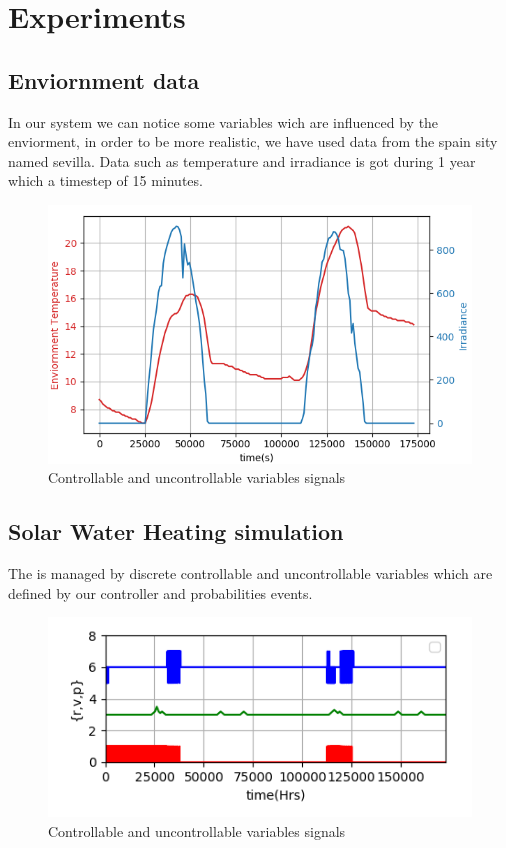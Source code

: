 \documentclass[conference]{IEEEtran}
\begin{document}
\section{Experiments}

\subsection{Enviornment data}
In our system we can notice some variables wich are influenced by the enviorment,
in order to be more realistic, we have used data from the spain sity named sevilla.
Data such as temperature and irradiance is got during 1 year which a timestep 
of 15 minutes.

\begin{figure}[H]  %
  \includegraphics[scale = 0.35]{7}
  \caption{Controllable and uncontrollable variables signals}
  \centering
\end{figure}



\subsection{Solar Water Heating simulation}\label{AA}

The is managed by discrete controllable and uncontrollable variables 
which are defined by our controller and probabilities events.

\begin{figure}[H]  %
  \includegraphics[scale = 0.5]{3_1}
  \caption{Controllable and uncontrollable variables signals}
  \centering
\end{figure}
\end{document}
